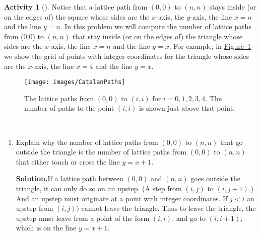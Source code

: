 \documentclass[10pt,]{book}
\theoremstyle{plain}
\theoremstyle{definition}
\newtheorem{activity}[project]{Activity}
\numberwithin{equation}{chapter}
\newcommand{\lt}{<}
\begin{document}
\begin{activity}[]\label{activity-51}
Notice that a lattice path from \((0,0)\) to \((n,n)\) stays inside (or on the edges of) the square whose sides are the \(x\)-axis, the \(y\)-axis, the line \(x=n\) and the line \(y=n\). In this problem we will compute the number of lattice paths from (0,0) to \((n,n)\) that stay inside (or on the edges of) the triangle whose sides are the \(x\)-axis, the line \(x=n\) and the line \(y=x\). For example, in \hyperref[CatalanPaths]{Figure~\ref{CatalanPaths}} we show the grid of points with integer coordinates for the triangle whose sides are the \(x\)-axis, the line \(x=4\) and the line \(y=x\).%
\begin{figure}
\centering
\texttt{[image: images/CatalanPaths]}
\caption{The lattice paths from \((0,0)\) to \((i,i)\) for \(i=0,1,2,3,4\).  The number of paths to the point \((i,i)\) is shown just above that point.\label{CatalanPaths}}
\end{figure}
~\par
\begin{enumerate}[label=(\alph*)]
 \item Explain why the number of lattice paths from \((0,0)\) to \((n,n)\) that go outside the triangle is the number of lattice paths from \((0,0)\) to \((n,n)\) that either touch or cross the line \(y=x+1\).%
\par\medskip\noindent%
\textbf{Solution.}\quad If a lattice path between \((0,0)\) and \((n,n)\) goes outside the triangle, it can only do so on an upstep. (A step from \((i,j)\) to \((i,j+1)\).) And an upstep must originate at a point with integer coordinates. If \(j\lt i\) an upstep from \((i,j))\) cannot leave the triangle. Thus to leave the triangle, the upstep must leave from a point of the form \((i,i)\), and go to \((i,i+1)\), which is on the line \(y=x+1\).%


\end{enumerate}
\end{activity}
\end{document}
